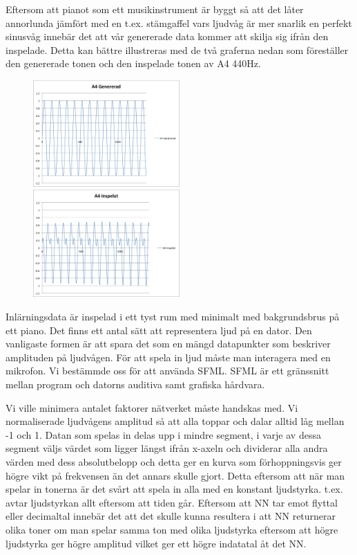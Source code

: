 \documentclass[a4paper,10pt]{article}
\begin{document}
Eftersom att pianot som ett musikinstrument är byggt så att det låter annorlunda jämfört med en t.ex. stämgaffel vars ljudvåg är mer snarlik en perfekt sinusvåg innebär det att vår genererade data kommer att skilja sig ifrån den inspelade. Detta kan bättre illustreras med de två graferna nedan som föreställer den genererade tonen och den inspelade tonen av A4 440Hz. 
\begin{figure}[ht]
\includegraphics[width=0.5\textwidth]{A4gen}
\includegraphics[width=0.5\textwidth]{A4p}
\end{figure}

Inlärningsdata är inspelad i ett tyst rum med minimalt med bakgrundsbrus på ett piano. 
Det finns ett antal sätt att representera ljud på en dator. Den vanligaste formen är att spara det som en mängd datapunkter som beskriver amplituden på ljudvågen.
För att spela in ljud måste man interagera med en mikrofon. Vi bestämmde oss för att använda SFML. SFML är ett gränssnitt mellan program och datorns auditiva samt grafiska hårdvara. 

Vi ville minimera antalet faktorer nätverket måste handskas med. Vi normaliserade ljudvågens amplitud så att alla toppar och dalar alltid låg mellan -1 och 1. Datan som spelas in delas upp i mindre segment, i varje av dessa segment väljs värdet som ligger längst ifrån x-axeln och dividerar alla andra värden med dess absolutbelopp och detta ger en kurva som förhoppningsvis ger högre vikt på frekvensen än det annars skulle gjort. Detta eftersom att när man spelar in tonerna är det svårt att spela in alla med en konstant ljudstyrka. t.ex. avtar ljudstyrkan allt eftersom att tiden går. Eftersom att NN tar emot flyttal eller decimaltal innebär det att det skulle kunna resultera i att NN returnerar olika toner om man spelar samma ton med olika ljudstyrka eftersom att högre ljudstyrka ger högre amplitud vilket ger ett högre indatatal åt det NN.
\end{document}
